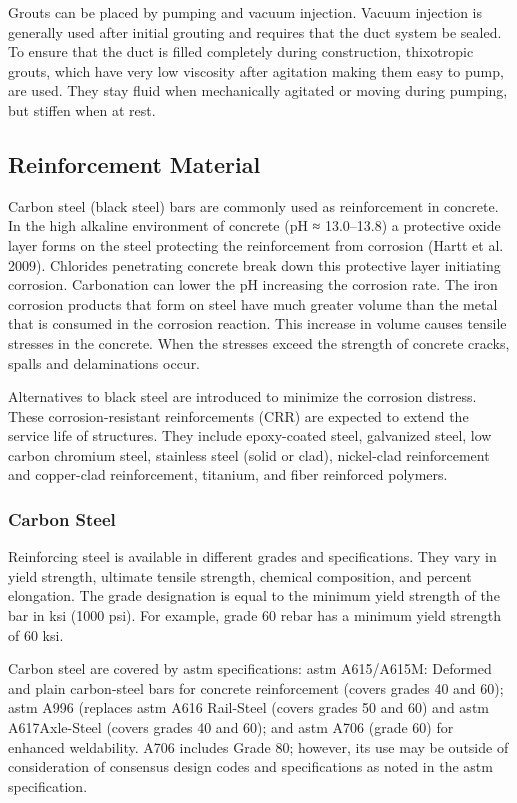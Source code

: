 Grouts can be placed by pumping and vacuum injection. Vacuum injection is generally used after initial grouting
and requires that the duct system be sealed. To ensure that the duct is filled completely during construction,
thixotropic grouts, which have very low viscosity after agitation making them easy to pump, are used. They stay fluid
when mechanically agitated or moving during pumping, but stiffen when at rest.


\subsection{Reinforcement Material}
\label{subsec:reinforcement-material}
Carbon steel (black steel) bars are commonly used as reinforcement in concrete. In the high alkaline
environment of concrete (pH ≈ 13.0–13.8) a protective oxide layer forms on the steel protecting the reinforcement
from corrosion (Hartt et al. 2009). Chlorides penetrating concrete break down this protective layer initiating
corrosion. Carbonation can lower the pH increasing the corrosion rate. The iron corrosion products that form on steel
have much greater volume than the metal that is consumed in the corrosion reaction. This increase in volume causes
tensile stresses in the concrete. When the stresses exceed the strength of concrete cracks, spalls and delaminations
occur.

Alternatives to black steel are introduced to minimize the corrosion distress. These corrosion-resistant
reinforcements (CRR) are expected to extend the service life of structures. They include epoxy-coated steel,
galvanized steel, low carbon chromium steel, stainless steel (solid or clad), nickel-clad reinforcement and copper-clad
reinforcement, titanium, and fiber reinforced polymers.

\subsubsection{Carbon Steel}
Reinforcing steel is available in different grades and specifications. They vary in yield strength, ultimate tensile
strength, chemical composition, and percent elongation. The grade designation is equal to the minimum yield
strength of the bar in ksi (1000 psi). For example, grade 60 rebar has a minimum yield strength of 60 ksi.

Carbon steel are covered by \acrshort*{astm} specifications: \acrshort*{astm} A615/A615M: Deformed and plain carbon-steel bars
for concrete reinforcement (covers grades 40 and 60); \acrshort*{astm} A996 (replaces \acrshort*{astm} A616 Rail-Steel (covers grades
50 and 60) and \acrshort*{astm} A617Axle-Steel (covers grades 40 and 60); and \acrshort*{astm} A706 (grade 60) for enhanced weldability. A706 includes Grade 80; however, its use may be outside of consideration of consensus design codes
and specifications as noted in the \acrshort*{astm} specification.

